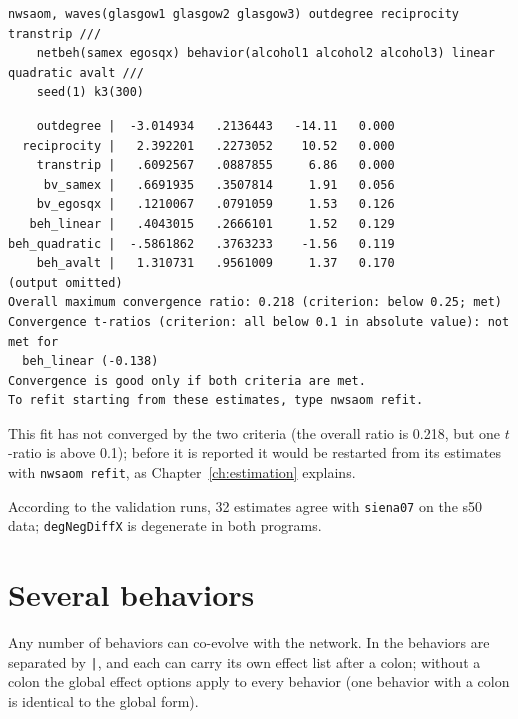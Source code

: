 \begin{lstlisting}
nwsaom, waves(glasgow1 glasgow2 glasgow3) outdegree reciprocity transtrip ///
    netbeh(samex egosqx) behavior(alcohol1 alcohol2 alcohol3) linear quadratic avalt ///
    seed(1) k3(300)
\end{lstlisting}
\begin{lstlisting}
    outdegree |  -3.014934   .2136443   -14.11   0.000
  reciprocity |   2.392201   .2273052    10.52   0.000
    transtrip |   .6092567   .0887855     6.86   0.000
     bv_samex |   .6691935   .3507814     1.91   0.056
    bv_egosqx |   .1210067   .0791059     1.53   0.126
   beh_linear |   .4043015   .2666101     1.52   0.129
beh_quadratic |  -.5861862   .3763233    -1.56   0.119
    beh_avalt |   1.310731   .9561009     1.37   0.170
(output omitted)
Overall maximum convergence ratio: 0.218 (criterion: below 0.25; met)
Convergence t-ratios (criterion: all below 0.1 in absolute value): not met for
  beh_linear (-0.138)
Convergence is good only if both criteria are met.
To refit starting from these estimates, type nwsaom refit.
\end{lstlisting}
This fit has not converged by the two criteria (the overall ratio is 0.218, but one $t$-ratio is above 0.1); before it is reported it would be restarted from its estimates with \texttt{nwsaom refit}, as Chapter~\ref{ch:estimation} explains.

According to the validation runs, 32  estimates agree with \texttt{siena07} on the s50 data; \texttt{degNegDiffX} is degenerate in both programs.

\section{Several behaviors}\label{sec:multibeh}

Any number of behaviors can co-evolve with the network. In  the behaviors are separated by \texttt{|}, and each can carry its own effect list after a colon; without a colon the global effect options apply to every behavior (one behavior with a colon is identical to the global form).

